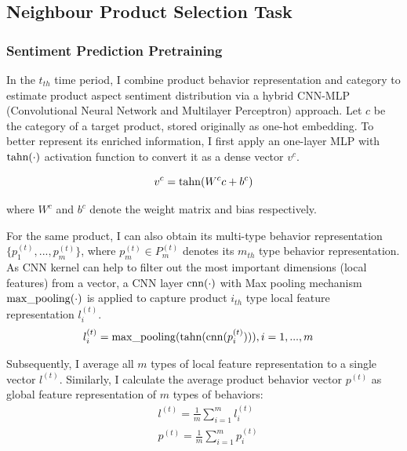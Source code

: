 \subsection{Neighbour Product Selection Task}\label{sc:npst}

\subsubsection{Sentiment Prediction Pretraining} \label{sc:spp}

In the $t_{th}$ time period, I combine product behavior representation and category to estimate product aspect sentiment distribution via a hybrid CNN-MLP (Convolutional Neural Network and Multilayer Perceptron) approach. Let $c$ be the category of a target product, stored originally as one-hot embedding. To better represent its enriched information, I first apply an one-layer MLP with $\rm tahn(\cdot)$ activation function to convert it as a dense vector $v^{c}$.

\begin{equation}
v^{c} = {\rm tahn}(W^{c}c+b^{c})
\end{equation}

where $W^{c}$ and $b^c$ denote the weight matrix and bias respectively.

For the same product, I can also obtain its multi-type behavior representation $\{p^{(t)}_{1},...,p^{(t)}_{m}\}$, where $p^{(t)}_{m} \in P^{(t)}_{m}$ denotes its $m_{th}$ type behavior representation. As CNN kernel can help to filter out the most important dimensions (local features) from a vector, a CNN layer ${\rm cnn}(\cdot)$ with Max pooling mechanism ${\rm max\_pooling}(\cdot)$ is applied to capture product $i_{th}$ type local feature representation $l^{(t)}_{i}$.
\begin{equation}
\begin{aligned} 
&l^{(t)}_{i} = {\rm max\_pooling}({\rm tahn}({\rm cnn}(p^{(t)}_{i}))), i= 1,...,m
\end{aligned} 
\end{equation}


Subsequently, I average all $m$ types of local feature representation to a single vector $l^{(t)}$. Similarly, I calculate the average product behavior vector $p^{(t)}$ as global feature representation of $m$ types of behaviors: 
\begin{equation}
\begin{aligned} 
&l^{(t)} = \frac{1}{m}\sum_{i = 1}^{m}l^{(t)}_{i} \\
&p^{(t)} = \frac{1}{m}\sum_{i = 1}^{m}p^{(t)}_{i} 
\end{aligned} 
\end{equation}

